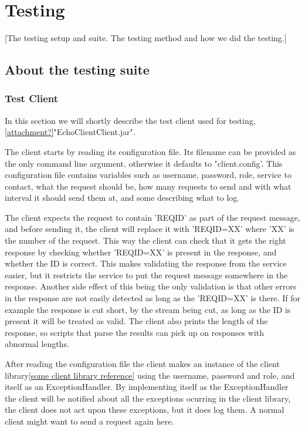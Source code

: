 \section{Testing}\label{Testing}
    [The testing setup and suite. The testing method and how we did the testing.]
    
    
    \subsection{About the testing suite}\label{Testing:About}
        \subsubsection{Test Client}\label{Testing:About:Client}
            In this section we will shortly describe the test client used for testing, \ref{attachment?}"EchoClientClient.jar".

            The client starts by reading its configuration file. Its filename can be provided as the only command line argument, otherwise it defaults to "client.config'. This configuration file contains variables such as username, password, role, service to contact, what the request should be, how many requests to send and with what interval it should send them at, and some describing what to log.

            The client expects the request to contain '{REQID}' as part of the request message, and before sending it, the client will replace it with '{REQID=XX}' where 'XX' is the number of the request. This way the client can check that it gets the right response by checking whether '{REQID=XX}' is present in the response, and whether the ID is correct. This makes validating the response from the service easier, but it restricts the service to put the request message somewhere in the response. Another side effect of this being the only validation is that other errors in the response are not easily detected as long as the '{REQID=XX}' is there. If for example the response is cut short, by the stream being cut, as long as the ID is present it will be treated as valid. The client also prints the length of the response, so scripts that parse the results can pick up on responses with abnormal lengths.

            After reading the configuration file the client makes an instance of the client library\ref{some client library reference} 
            using the username, password and role, and itself as an ExceptionHandler. By implementing itself as the ExceptionHandler the client will be notified about all the exceptions ocurring in the client library, the client does not act upon these exceptions, but it does log them. A normal client might want to send a request again here.
            
